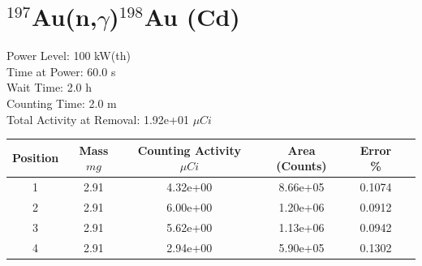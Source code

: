 \newpage

\section*{ $^{197}$Au(n,$\gamma$)$^{198}$Au (Cd) }

Power Level: 100 kW(th) \\
Time at Power: 60.0 s \\
Wait Time:  2.0 h \\
Counting Time:  2.0 m \\
Total Activity at Removal: 1.92e+01 $\mu Ci$

\begin{table}[h]
\centering
\begin{tabular}{ |c|c|c|c|c|c| }
 \hline
 Position & Mass $mg$ & Counting Activity $\mu Ci$ & Area (Counts) & Error \% \\
 \hline 
 1 & 2.91 & 4.32e+00 & 8.66e+05 & 0.1074 \\ 
\hline
 2 & 2.91 & 6.00e+00 & 1.20e+06 & 0.0912 \\ 
\hline
 3 & 2.91 & 5.62e+00 & 1.13e+06 & 0.0942 \\ 
\hline
 4 & 2.91 & 2.94e+00 & 5.90e+05 & 0.1302 \\ 
\hline
\end{tabular}
\end{table}

